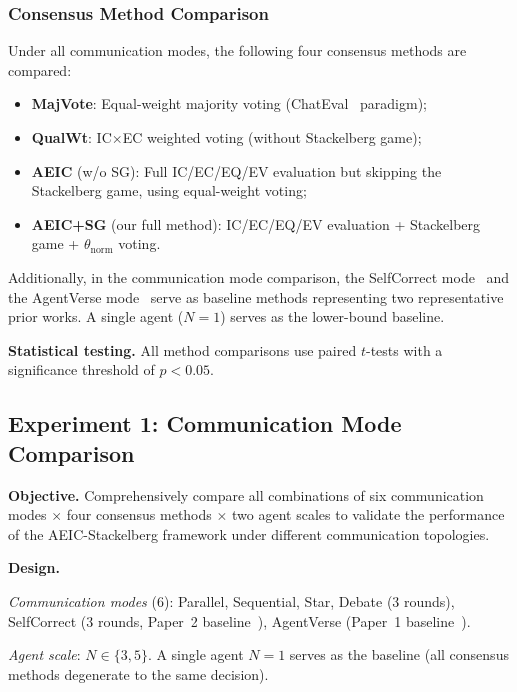 \documentclass[12pt,a4paper]{article}
\begin{document}
\subsubsection{Consensus Method Comparison}

Under all communication modes, the following four consensus methods are compared:
\begin{itemize}[nosep]
    \item \textbf{MajVote}: Equal-weight majority voting (ChatEval~\cite{chan2023chateval} paradigm);
    \item \textbf{QualWt}: IC$\times$EC weighted voting (without Stackelberg game);
    \item \textbf{AEIC} (w/o SG): Full IC/EC/EQ/EV evaluation but skipping the Stackelberg game, using equal-weight voting;
    \item \textbf{AEIC+SG} (our full method): IC/EC/EQ/EV evaluation + Stackelberg game + $\theta_{\text{norm}}$ voting.
\end{itemize}

Additionally, in the communication mode comparison, the SelfCorrect mode~\cite{bertalanic2026cost} and the AgentVerse mode~\cite{chen2023agentverse} serve as baseline methods representing two representative prior works. A single agent ($N=1$) serves as the lower-bound baseline.

\textbf{Statistical testing.} All method comparisons use paired $t$-tests with a significance threshold of $p < 0.05$.

\subsection{Experiment 1: Communication Mode Comparison}\label{sec:exp1}

\textbf{Objective.} Comprehensively compare all combinations of six communication modes $\times$ four consensus methods $\times$ two agent scales to validate the performance of the AEIC-Stackelberg framework under different communication topologies.

\textbf{Design.}

\textit{Communication modes} (6): Parallel, Sequential, Star, Debate (3 rounds), SelfCorrect (3 rounds, Paper~2 baseline~\cite{bertalanic2026cost}), AgentVerse (Paper~1 baseline~\cite{chen2023agentverse}).

\textit{Agent scale}: $N \in \{3, 5\}$. A single agent $N=1$ serves as the baseline (all consensus methods degenerate to the same decision).
\end{document}
